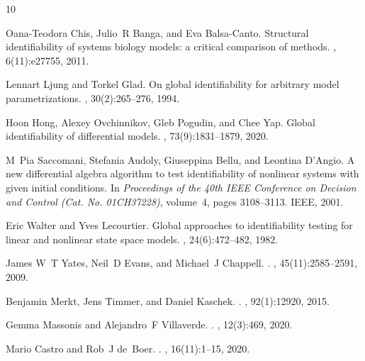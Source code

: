 \documentclass[12pt]{article}
\begin{document}
\begin{thebibliography}{10}

Oana-Teodora Chis, Julio~R Banga, and Eva Balsa-Canto.
\newblock Structural identifiability of systems biology models: a critical
  comparison of methods.
, 6(11):e27755, 2011.

Lennart Ljung and Torkel Glad.
\newblock On global identifiability for arbitrary model parametrizations.
, 30(2):265--276, 1994.

Hoon Hong, Alexey Ovchinnikov, Gleb Pogudin, and Chee Yap.
\newblock Global identifiability of differential models.
,
  73(9):1831--1879, 2020.

M~Pia Saccomani, Stefania Audoly, Giuseppina Bellu, and Leontina D'Angio.
\newblock A new differential algebra algorithm to test identifiability of
  nonlinear systems with given initial conditions.
\newblock In {\em Proceedings of the 40th IEEE Conference on Decision and
  Control (Cat. No. 01CH37228)}, volume~4, pages 3108--3113. IEEE, 2001.

Eric Walter and Yves Lecourtier.
\newblock Global approaches to identifiability testing for linear and nonlinear
  state space models.
, 24(6):472--482, 1982.

James W~T Yates, Neil~D Evans, and Michael~J Chappell.
.
, 45(11):2585--2591, 2009.

Benjamin Merkt, Jens Timmer, and Daniel Kaschek.
.
, 92(1):12920, 2015.

Gemma Massonis and Alejandro~F Villaverde.
.
, 12(3):469, 2020.

Mario Castro and Rob~J de~Boer.
.
, 16(11):1--15, 2020.


\end{thebibliography}
\end{document}
